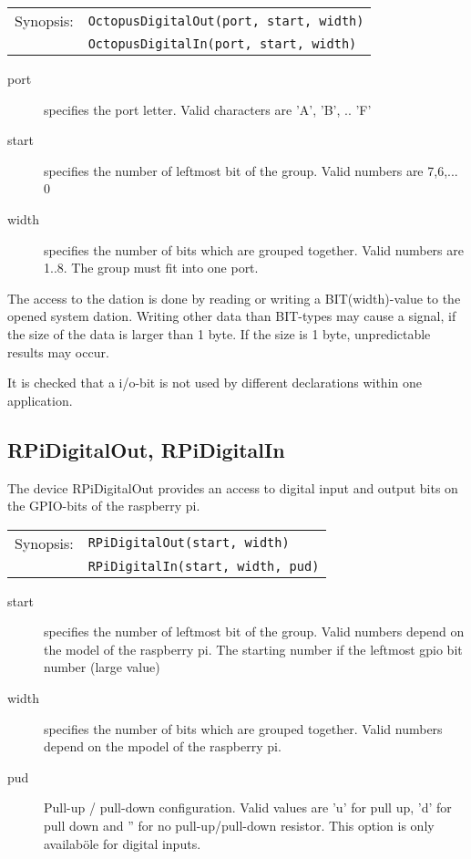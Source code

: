 \begin{tabular}{ll}
Synopsis:& \verb|OctopusDigitalOut(port, start, width)|\\
        & \verb|OctopusDigitalIn(port, start, width)|\\
\end{tabular}

\begin{description}
\item [port] specifies the port letter. Valid characters are 'A', 'B', .. 'F'
\item[start] specifies the number of leftmost bit of the group. Valid numbers
     are 7,6,... 0
\item [width] specifies the number of bits which are grouped together.
     Valid numbers are 1..8.
     The group must fit into one port.
\end{description}

The access to the dation is done by reading or writing a BIT(width)-value to the
opened system dation. 
Writing other data than BIT-types  may cause a signal, if the size of the
data is larger than 1 byte. If the size is 1 byte, unpredictable results may
occur.

It is checked that a i/o-bit is not used by different declarations within
one application.
  
\subsection{RPiDigitalOut, RPiDigitalIn}
The device RPiDigitalOut provides an access to digital input and output bits
on the GPIO-bits of the raspberry pi.

\begin{tabular}{ll}
Synopsis: & \verb|RPiDigitalOut(start, width)| \\
          & \verb|RPiDigitalIn(start, width, pud)| \\
\end{tabular}

\begin{description}
\item[start] specifies the number of leftmost bit of the group. Valid numbers
     depend on the model of the raspberry pi. The starting number if
     the leftmost gpio bit number (large value)
\item [width] specifies the number of bits which are grouped together.
     Valid numbers depend on the mpodel of the raspberry pi.
\item [pud] Pull-up / pull-down configuration.
    Valid values are 'u' for pull up, 'd' for pull down and 
    '' for no pull-up/pull-down resistor. This option is only
    availaböle for digital inputs.
\end{description}

